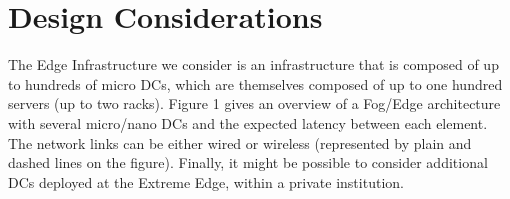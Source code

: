 

\section{Design Considerations}

The Edge Infrastructure we consider is an infrastructure that
is composed of up to hundreds of micro DCs, which are themselves
composed of up to one hundred servers (up to two racks). Figure 1
gives an overview of a Fog/Edge architecture with several micro/nano
DCs and the expected latency between each element. The network links
can be either wired or wireless (represented by plain and dashed lines
on the figure). Finally, it might be possible to consider additional
DCs deployed at the Extreme Edge, within a private institution.


